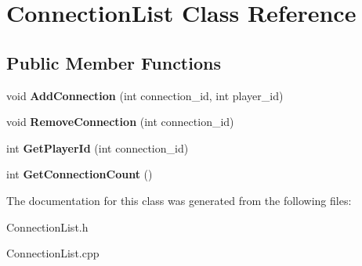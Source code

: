 \hypertarget{class_connection_list}{}\section{Connection\+List Class Reference}
\label{class_connection_list}
\subsection*{Public Member Functions}
\begin{DoxyCompactItemize}
\item 
\hypertarget{class_connection_list_a70f15746760e5eaa95f8d6fc3a07fd87}{}void {\bfseries Add\+Connection} (int connection\+\_\+id, int player\+\_\+id)\label{class_connection_list_a70f15746760e5eaa95f8d6fc3a07fd87}

\item 
\hypertarget{class_connection_list_ab489bd8f125718639c8d380313fc0119}{}void {\bfseries Remove\+Connection} (int connection\+\_\+id)\label{class_connection_list_ab489bd8f125718639c8d380313fc0119}

\item 
\hypertarget{class_connection_list_acdcbe6b6e3230fbcaf7b2ca0ade6e262}{}int {\bfseries Get\+Player\+Id} (int connection\+\_\+id)\label{class_connection_list_acdcbe6b6e3230fbcaf7b2ca0ade6e262}

\item 
\hypertarget{class_connection_list_a9401a5b5ff17d37ad078ac41ecbdb0cb}{}int {\bfseries Get\+Connection\+Count} ()\label{class_connection_list_a9401a5b5ff17d37ad078ac41ecbdb0cb}

\end{DoxyCompactItemize}


The documentation for this class was generated from the following files\+:\begin{DoxyCompactItemize}
\item 
Connection\+List.\+h\item 
Connection\+List.\+cpp\end{DoxyCompactItemize}
